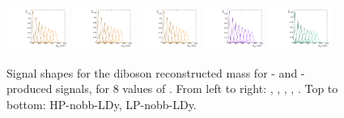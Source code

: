 \begin{figure}[htbp]
  \includegraphics[width=0.18\textwidth]{fig/2Dfit/templateSignalVsMX_fromDC_GbuToWW_MVV_mu_LP_nobb_LDy.pdf}
  \includegraphics[width=0.18\textwidth]{fig/2Dfit/templateSignalVsMX_fromDC_RadToWW_MVV_mu_LP_nobb_LDy.pdf}
  \includegraphics[width=0.18\textwidth]{fig/2Dfit/templateSignalVsMX_fromDC_ZprToWW_MVV_mu_LP_nobb_LDy.pdf}
  \includegraphics[width=0.18\textwidth]{fig/2Dfit/templateSignalVsMX_fromDC_WprToWZ_MVV_mu_LP_nobb_LDy.pdf}
  \includegraphics[width=0.18\textwidth]{fig/2Dfit/templateSignalVsMX_fromDC_WprToWH_MVV_mu_LP_nobb_LDy.pdf}\\
  \caption{
    Signal shapes for the diboson reconstructed mass \MVV for \ggF- and \DY-produced signals, for 8 values of \MX.
    From left to right: \GBulktoWW, \RadtoWW, \ZprtoWW, \WprtoWZ, \WprtoWH.
    Top to bottom: HP-nobb-LDy, LP-nobb-LDy.
  }
  \label{fig:MVVShapes_NonVBF_LDy_Run2}
\end{figure}

